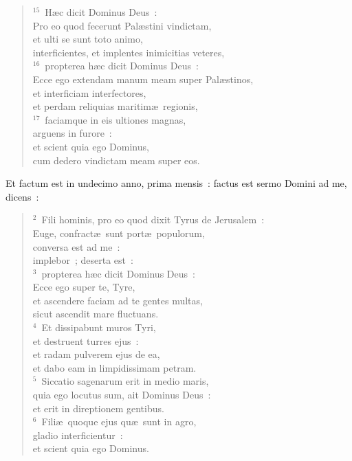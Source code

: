 \begin{flushleft}\begin{verse}${}^{15}$~H\ae c dicit Dominus Deus~:\\ Pro eo quod fecerunt Pal\ae stini vindictam,\\ et ulti se sunt toto animo,\\ interficientes, et implentes inimicitias veteres,\\
${}^{16}$~propterea h\ae c dicit Dominus Deus~:\\ Ecce ego extendam manum meam super Pal\ae stinos,\\ et interficiam interfectores,\\ et perdam reliquias maritim\ae\ regionis,\\
${}^{17}$~faciamque in eis ultiones magnas,\\ arguens in furore~:\\ et scient quia ego Dominus,\\ cum dedero vindictam meam super eos.\end{verse}\end{flushleft}



\lettrine[lines=10,image=true,loversize=0.05,lraise=-0.03]{E}{}t factum est in undecimo anno, prima mensis~: factus est sermo Domini ad me, dicens~:
\begin{flushleft}\begin{verse}\vspace{6pt}${}^{2}$~Fili hominis, pro eo quod dixit Tyrus de Jerusalem~:\\ Euge, confract\ae\ sunt port\ae\ populorum,\\ conversa est ad me~:\\ implebor~; deserta est~:\\
${}^{3}$~propterea h\ae c dicit Dominus Deus~:\\ Ecce ego super te, Tyre,\\ et ascendere faciam ad te gentes multas,\\ sicut ascendit mare fluctuans.\\
${}^{4}$~Et dissipabunt muros Tyri,\\ et destruent turres ejus~:\\ et radam pulverem ejus de ea,\\ et dabo eam in limpidissimam petram.\\
${}^{5}$~Siccatio sagenarum erit in medio maris,\\ quia ego locutus sum, ait Dominus Deus~:\\ et erit in direptionem gentibus.\\
${}^{6}$~Fili\ae\ quoque ejus qu\ae\ sunt in agro,\\ gladio interficientur~:\\ et scient quia ego Dominus.\end{verse}\end{flushleft}


